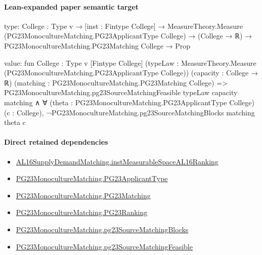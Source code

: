 \documentclass[10pt]{article}
\begin{document}
\paragraph{Lean-expanded paper semantic target}
\begin{ReviewVerbatim}
type:
{College : Type v} →
  [inst : Fintype College] →
    MeasureTheory.Measure (PG23MonocultureMatching.PG23ApplicantType College) →
      (College → ℝ) → PG23MonocultureMatching.PG23Matching College → Prop

value:
fun {College : Type v} [Fintype College]
    (typeLaw : MeasureTheory.Measure (PG23MonocultureMatching.PG23ApplicantType College)) (capacity : College → ℝ)
    (matching : PG23MonocultureMatching.PG23Matching College) =>
  PG23MonocultureMatching.pg23SourceMatchingFeasible typeLaw capacity matching ∧
    ∀ (theta : PG23MonocultureMatching.PG23ApplicantType College) (c : College),
      ¬PG23MonocultureMatching.pg23SourceMatchingBlocks matching theta c
\end{ReviewVerbatim}

\paragraph{Direct retained dependencies}
\begin{itemize}\raggedright
\item \hyperlink{governing-declaration-45aa1aca7604d942}{AL16\allowbreak{}Supply\allowbreak{}Demand\allowbreak{}Matching.\allowbreak{}inst\allowbreak{}Measurable\allowbreak{}Space\allowbreak{}AL16\allowbreak{}Ranking}
\item \hyperlink{paper-prerequisite-40ad59c353cf95ec}{PG23\allowbreak{}Monoculture\allowbreak{}Matching.\allowbreak{}PG23\allowbreak{}Applicant\allowbreak{}Type}
\item \hyperlink{paper-prerequisite-6458c12e2da75e1b}{PG23\allowbreak{}Monoculture\allowbreak{}Matching.\allowbreak{}PG23\allowbreak{}Matching}
\item \hyperlink{paper-prerequisite-8769258a80216d15}{PG23\allowbreak{}Monoculture\allowbreak{}Matching.\allowbreak{}PG23\allowbreak{}Ranking}
\item \hyperlink{paper-prerequisite-f53623070977fa8a}{PG23\allowbreak{}Monoculture\allowbreak{}Matching.\allowbreak{}pg23\allowbreak{}Source\allowbreak{}Matching\allowbreak{}Blocks}
\item \hyperlink{paper-prerequisite-500c3d3f4de9e8d5}{PG23\allowbreak{}Monoculture\allowbreak{}Matching.\allowbreak{}pg23\allowbreak{}Source\allowbreak{}Matching\allowbreak{}Feasible}
\end{itemize}
\end{document}
